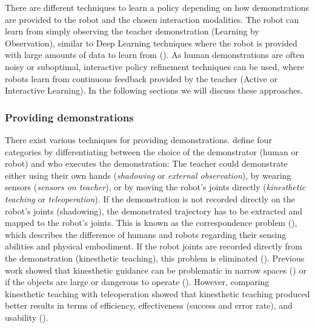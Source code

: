 There are different techniques to learn a policy depending on how demonstrations are provided to the robot and the chosen interaction modalities.
The robot can learn from simply observing the teacher demonstration (Learning by Observation), similar to Deep Learning techniques where the robot is provided with large amounts of data to learn from (\cite{kuniyoshi1994learning,yang2016development}).
As human demonstrations are often noisy or suboptimal, interactive policy refinement techniques can be used, where robots learn from continuous feedback provided by the teacher (Active or Interactive Learning).
In the following sections we will discuss these approaches.



\subsubsection{Providing demonstrations}
There exist various techniques for providing demonstrations.
\cite{argall2009survey} define four categories by differentiating between the choice of the demonstrator (human or robot) and who executes the demonstration:
The teacher could demonstrate either using their own hands (\textit{shadowing} %
 or \textit{external observation}), by wearing sensors (\textit{sensors on teacher}), or by moving the robot's joints directly (\textit{kinesthetic teaching} or \textit{teleoperation}).
If the demonstration is not recorded directly on the robot's joints (\eg shadowing), the demonstrated trajectory has to be extracted and mapped to the robot's joints.
This is known as the correspondence problem (\cite{nehaniv2002correspondence}), which describes the difference of humans and robots regarding their sensing abilities and physical embodiment.
If the robot joints are recorded directly from the demonstration (\eg kinesthetic teaching), this problem is eliminated (\cite{chernova2014robot}).
Previous work showed that kinesthetic guidance can be problematic in narrow spaces (\cite{wrede2013user}) or if the objects are large or dangerous to operate (\cite{chernova2014robot}).
However, comparing kinesthetic teaching with teleoperation showed that kinesthetic teaching produced better results in terms of efficiency, effectiveness (success and error rate), and usability (\cite{fischer2016comparison,chernova2014robot,akgun2011robot}).


